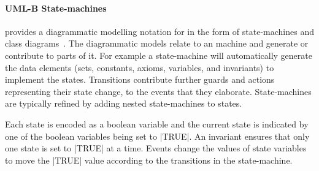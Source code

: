 

\paragraph{UML-B State-machines} provides a diagrammatic modelling notation for \EventB in the form of state-machines and class diagrams~\cite{said15:umlbSosym,snook14:iumlbStatem,snook06umlbTosem}. 
The diagrammatic models relate to an \EventB machine and generate or contribute to parts of it. 
For example a state-machine will automatically generate the \EventB data elements (sets, constants, axioms, variables, and invariants) to implement the states. 
Transitions contribute further guards and actions representing their state change, to the events that they elaborate.  
State-machines are typically refined by adding nested state-machines to states.

Each state is encoded as a boolean variable and the current state is indicated by one of the boolean variables being set to |TRUE|. 
An invariant ensures that only one state is set to |TRUE| at a time.
Events change the values of state variables to move the |TRUE| value according to the transitions in the state-machine.  
	
